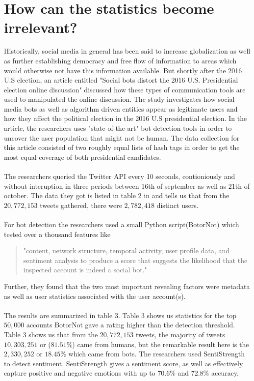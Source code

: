 \section{How can the statistics become irrelevant?}\label{Labl:emil:election}
Historically, social media in general has been said to increase globalization as well as further establishing democracy and free flow of information to areas which would otherwise not have this information available. But shortly after the 2016 U.S election, an article entitled "Social bots distort the 2016 U.S. Presidential election online discussion" \cite{Emil:FM7090} discussed how these types of communication tools are used to manipulated the online discussion. The study investigates how social media bots as well as algorithm driven entities appear as legitimate users and how they affect the political election in the 2016 U.S presidential election. In the article, the researchers uses "state-of-the-art" bot detection tools in order to uncover the user population that might not be human. The data collection for this article consisted of two roughly equal lists of hash tags in order to get the most equal coverage of both presidential candidates. \\ \\
The researchers queried the Twitter API every 10 seconds, contioniously and without interuption in three periods between 16th of september as well as 21th of october\cite{Emil:FM7090}. The data they got is listed in table 2 in \cite{Emil:FM7090} and tells us that from the $20,772,153$ tweets gathered, there were $2,782,418$ distinct users. 
\\
\\
For bot detection the researchers used a small Python script(BotorNot) which tested over a thousand features like 
\begin{quote}
"content, network structure, temporal activity, user profile data, and sentiment analysis to produce a score that suggests the likelihood that the inspected account is indeed a social bot."
\cite{Emil:FM7090}

\end{quote}
Further, they found that the two most important revealing factors were metadata as well as user statistics associated with the user account(s). \\
\\
The results are summarized in \cite{Emil:FM7090} table 3. Table 3 shows us statistics for the top $50,000$ accounts BotorNot gave a rating higher than the detection threshold. Table 3 shows us that from the $20,772,153$\cite{Emil:FM7090} tweets, the majority of tweets $10,303,251$ or (\textbf{$81.51\%$})\cite{Emil:FM7090} came from humans, but the remarkable result here is the $2,330,252$ or $18.45\%$ \cite{Emil:FM7090}which came from bots. The researchers used SentiStrength\cite{Emil:FM7090} to detect sentiment. SentiStrength gives a sentiment score, as well as effectively capture positive and negative emotions with up to 70.6\% and 72.8\% \cite{Emil:FM7090} accuracy. 


